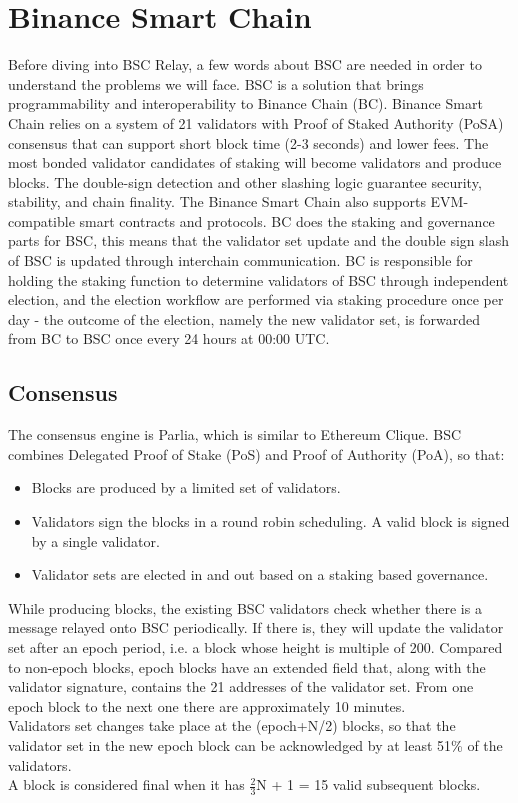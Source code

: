 \section{Binance Smart Chain}
Before diving into BSC Relay, a few words about BSC are needed in order to understand the problems we will face.
BSC is a solution that brings programmability and interoperability to Binance Chain (BC). Binance Smart Chain relies on a system of 21 validators with Proof of Staked Authority (PoSA) consensus that can support short block time (2-3 seconds) and lower fees. The most bonded validator candidates of staking will become validators and produce blocks. The double-sign detection and other slashing logic guarantee security, stability, and chain finality. The Binance Smart Chain also supports EVM-compatible smart contracts and protocols.
\noindent
BC does the staking and governance parts for BSC, this means that the validator set update and the double sign slash of BSC is updated through interchain communication. BC is responsible for holding the staking function to determine validators of BSC through independent election, and the election workflow are performed via staking procedure once per day - the outcome of the election, namely the new validator set, is forwarded from BC to BSC once every 24 hours at 00:00 UTC.

\subsection{Consensus}
The consensus engine is Parlia, which is similar to Ethereum Clique. BSC combines Delegated Proof of Stake (PoS) and Proof of Authority (PoA), so that:
\begin{itemize}
    \item Blocks are produced by a limited set of validators.
    \item Validators sign the blocks in a round robin scheduling. A valid block is signed by a single validator.
    \item Validator sets are elected in and out based on a staking based governance.
\end{itemize}
\noindent
While producing blocks, the existing BSC validators check whether there is a \ValidatorSetUpdate message relayed onto BSC periodically. If there is, they will update the validator set after an epoch period, i.e. a block whose height is multiple of 200. Compared to non-epoch blocks, epoch blocks have an extended \extradata field that, along with the validator signature, contains the 21 addresses of the validator set. From one epoch block to the next one there are approximately 10 minutes.\\Validators set changes take place at the (epoch+N/2) blocks, so that the validator set in the new epoch block can be acknowledged by at least 51\% of the validators. \\ A block is considered final when it has $\frac{2}{3}$N + 1 = 15 valid subsequent blocks. 
